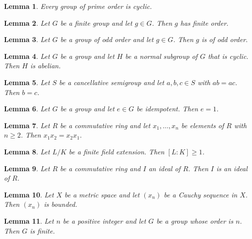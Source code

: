 \documentclass{article}
\newtheorem{lemma}{Lemma}
\begin{document}
\begin{lemma}\label{prime-order-cyclic}
Every group of prime order is cyclic.
\end{lemma}

\begin{lemma}\label{finite-order}
Let $G$ be a finite group and let $g\in G$. Then $g$ has finite order.
\end{lemma}

\begin{lemma}\label{odd-order}
Let $G$ be a group of odd order and let $g\in G$. Then $g$ is of odd order.
\end{lemma}

\begin{lemma}\label{cyclic-normal}
Let $G$ be a group and let $H$ be a normal subgroup of $G$ that is cyclic. Then $H$ is abelian.
\end{lemma}

\begin{lemma}\label{cancellation}
Let $S$ be a cancellative semigroup and let $a,b,c\in S$ with $ab=ac$. Then $b=c$.
\end{lemma}

\begin{lemma}\label{idempotent-identity}
Let $G$ be a group and let $e\in G$ be idempotent. Then $e=1$.
\end{lemma}

\begin{lemma}\label{commuting-family}
Let $R$ be a commutative ring and let $x_1,\dots,x_n$ be elements of $R$ with $n\ge2$. Then $x_1x_2=x_2x_1$.
\end{lemma}

\begin{lemma}\label{degree-positive}
Let $L/K$ be a finite field extension. Then $[L:K]\ge1$.
\end{lemma}

\begin{lemma}\label{ideal-ellipsis}
Let $R$ be a commutative ring and $I$ an ideal of $R$. Then $I$ is an ideal of $R$.
\end{lemma}

\begin{lemma}\label{cauchy-bounded}
Let $X$ be a metric space and let $(x_n)$ be a Cauchy sequence in $X$. Then $(x_n)$ is bounded.
\end{lemma}

\begin{lemma}\label{whose-order}
Let $n$ be a positive integer and let $G$ be a group whose order is $n$. Then $G$ is finite.
\end{lemma}
\end{document}
